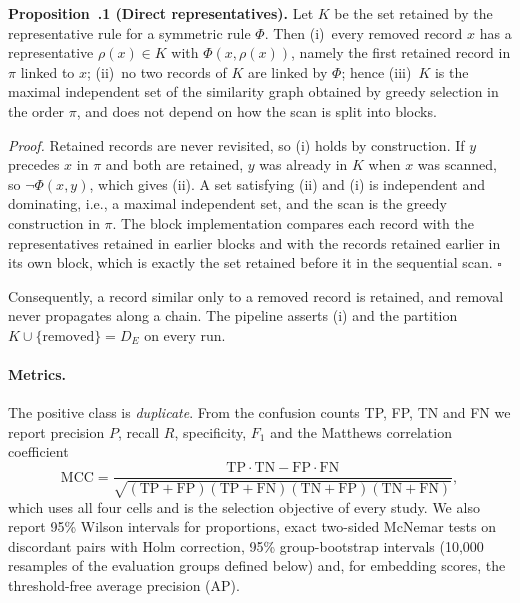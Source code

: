 \medskip\noindent\textbf{Proposition~\thesection.1 (Direct representatives).}
Let $K$ be the set retained by the representative rule for a symmetric rule
$\Phi$. Then (i)~every removed record $x$ has a representative
$\rho(x)\in K$ with $\Phi(x,\rho(x))$, namely the first retained record in
$\pi$ linked to $x$; (ii)~no two records of $K$ are linked by $\Phi$; hence
(iii)~$K$
is the maximal independent set of the similarity graph obtained by greedy
selection in the order $\pi$, and does not depend on how the scan is split
into blocks.

\noindent\emph{Proof.} Retained records are never revisited, so (i) holds by
construction. If $y$ precedes $x$ in $\pi$ and both are retained, $y$ was
already in $K$ when $x$ was scanned, so $\neg \Phi(x,y)$, which gives (ii). A
set satisfying (ii) and (i) is independent and dominating, i.e., a maximal
independent set, and the scan is the greedy construction in $\pi$. The block
implementation compares each record with the representatives retained in
earlier blocks and with the records retained earlier in its own block, which
is exactly the set retained before it in the sequential scan. $\square$

\smallskip\noindent Consequently, a record similar only to a removed record is
retained, and removal never propagates along a chain. The pipeline asserts
(i) and the partition $K \cup \{\text{removed}\} = D_E$ on every run.

\paragraph{Metrics.} The positive class is \emph{duplicate}. From the
confusion counts TP, FP, TN and FN we report precision $P$, recall $R$,
specificity, $F_1$ and the Matthews correlation coefficient
\begin{equation*}
\mathrm{MCC}=\frac{\mathrm{TP}\cdot\mathrm{TN}-\mathrm{FP}\cdot\mathrm{FN}}
{\sqrt{(\mathrm{TP}+\mathrm{FP})(\mathrm{TP}+\mathrm{FN})(\mathrm{TN}+\mathrm{FP})(\mathrm{TN}+\mathrm{FN})}},
\end{equation*}
which uses all four cells and is the selection objective of every study. We
also report 95\% Wilson intervals for proportions, exact two-sided McNemar
tests on discordant pairs with Holm correction, 95\% group-bootstrap
intervals (10,000 resamples of the evaluation groups defined below) and, for
embedding scores, the threshold-free average precision (AP).

